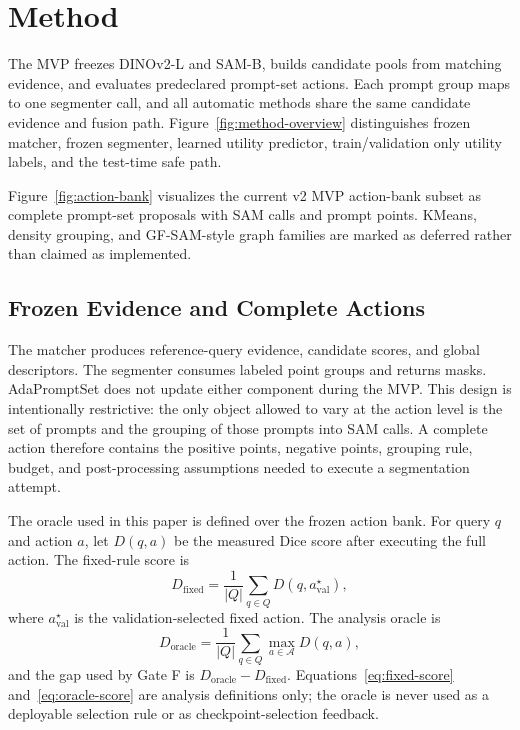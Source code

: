 \section{Method}
The MVP freezes DINOv2-L and SAM-B, builds candidate pools from matching evidence, and evaluates predeclared prompt-set actions. Each prompt group maps to one segmenter call, and all automatic methods share the same candidate evidence and fusion path. Figure~\ref{fig:method-overview} distinguishes frozen matcher, frozen segmenter, learned utility predictor, train/validation only utility labels, and the test-time safe path.

Figure~\ref{fig:action-bank} visualizes the current v2 MVP action-bank subset as complete prompt-set proposals with SAM calls and prompt points. KMeans, density grouping, and GF-SAM-style graph families are marked as deferred rather than claimed as implemented.

\subsection{Frozen Evidence and Complete Actions}
The matcher produces reference-query evidence, candidate scores, and global descriptors. The segmenter consumes labeled point groups and returns masks. AdaPromptSet does not update either component during the MVP. This design is intentionally restrictive: the only object allowed to vary at the action level is the set of prompts and the grouping of those prompts into SAM calls. A complete action therefore contains the positive points, negative points, grouping rule, budget, and post-processing assumptions needed to execute a segmentation attempt.

The oracle used in this paper is defined over the frozen action bank. For query $q$ and action $a$, let $D(q,a)$ be the measured Dice score after executing the full action. The fixed-rule score is
\begin{equation}
D_{\mathrm{fixed}}=\frac{1}{|Q|}\sum_{q\in Q}D(q,a^\star_{\mathrm{val}}),
\label{eq:fixed-score}
\end{equation}
where $a^\star_{\mathrm{val}}$ is the validation-selected fixed action. The analysis oracle is
\begin{equation}
D_{\mathrm{oracle}}=\frac{1}{|Q|}\sum_{q\in Q}\max_{a\in\mathcal{A}}D(q,a),
\label{eq:oracle-score}
\end{equation}
and the gap used by Gate F is $D_{\mathrm{oracle}}-D_{\mathrm{fixed}}$. Equations~\ref{eq:fixed-score} and~\ref{eq:oracle-score} are analysis definitions only; the oracle is never used as a deployable selection rule or as checkpoint-selection feedback.


